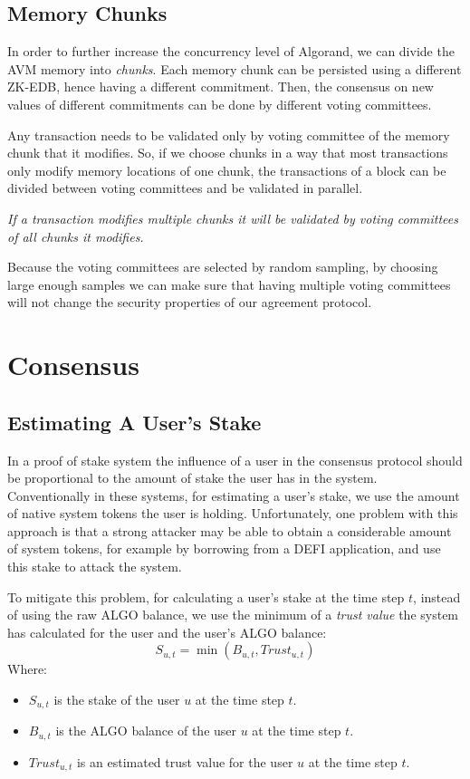 \documentclass[11pt, A4]{report}
\begin{document}
    \subsection{Memory Chunks}\label{subsec:memory-chunks}

    In order to further increase the concurrency level of Algorand, we can divide the AVM memory into \emph{chunks}.
    Each memory chunk can be persisted using a different ZK-EDB, hence having a different commitment. Then, the
    consensus on new values of different commitments can be done by different voting committees.

    Any transaction needs to be validated only by voting committee of the memory chunk that it modifies. So, if we
    choose chunks in a way that most transactions only modify memory locations of one chunk, the transactions of a
    block can be divided between voting committees and be validated in parallel.

    \emph{If a transaction modifies multiple chunks it will be validated by voting committees of all chunks it
    modifies.}

    Because the voting committees are selected by random sampling, by choosing large enough samples we can make sure
    that having multiple voting committees will not change the security properties of our agreement protocol.


    \section{Consensus}\label{sec:consensus}

    \subsection{Estimating A User's Stake}\label{subsec:estimating-a-user's-stake}

    In a proof of stake system the influence of a user in the consensus protocol should be proportional to the amount
    of stake the user has in the system. Conventionally in these systems, for estimating a user's stake, we use the
    amount of native system tokens the user is holding. Unfortunately, one problem with this approach is that a
    strong attacker may be able to obtain a considerable amount of system tokens, for example by borrowing from a
    DEFI application, and use this stake to attack the system.

    To mitigate this problem, for calculating a user's stake at the time step \(t\), instead of using the raw ALGO
    balance, we use the minimum of a \emph{trust value} the system has calculated for the user and the user's
    ALGO balance:
    \[
        S_{u,t} = \min (B_{u,t}, Trust_{u,t})
    \]
    Where:
    \begin{itemize}
        \item \(S_{u,t}\) is the stake of the user \(u\) at the time step \(t\).
        \item \(B_{u,t}\) is the ALGO balance of the user \(u\) at the time step \(t\).
        \item \(Trust_{u,t}\) is an estimated trust value for the user \(u\) at the time step \(t\).
    \end{itemize}
\end{document}
